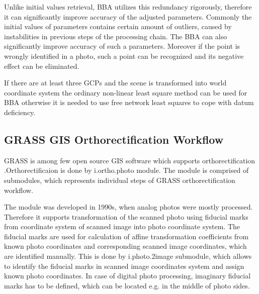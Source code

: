 \documentclass[a4paper,12pt]{article}
\begin{document}

Unlike initial values retrieval, BBA utilizes this redundancy rigorously, therefore 
it can significantly improve accuracy of the adjusted parameters.
Commonly the initial values of parameters contains certain amount of outliers, caused by instabilities in previous steps of the processing chain.
The BBA can also significantly improve accuracy of such a parameters.
Moreover if the point is wrongly identified in a photo, such a point can be recognized and its 
negative effect can be eliminated.

If  there are at least three GCPs and the scene is transformed into world coordinate system the ordinary non-linear least square method \label{sec:non_least} 
can be used for BBA otherwise
it is needed to use free network least squares \label{sec:free_net_least} to cope with datum deficiency. 

\subsection{GRASS GIS Orthorectification Workflow}

GRASS is among few open source GIS software which supports orthorectification
\cite{rocchini2012robust}.Orthorectificaion is done 
by i.ortho.photo \cite{i.ortho.photo} module.
The module is comprised of submodules, which represents individual steps of 
GRASS orthorectification workflow.


The module was developed in 1990s,  
when analog photos were mostly processed. Therefore it supports 
 transformation of the scanned photo using fiducial marks from coordinate system of scanned image into 
 photo coordinate system. The fiducial marks are used for calculation of 
 affine transformation coefficients from known photo coordinates 
 and corresponding scanned image coordinates, which are identified manually. 
 This is done by i.photo.2image submodule, which allows to identify the fiducial 
 marks in scanned image coordinates system and assign known photo coordinates.
  In case of digital photo processing, imaginary fiducial marks has to be defined, which
can be located e.g. in the middle of photo sides.  
  
\end{document}
